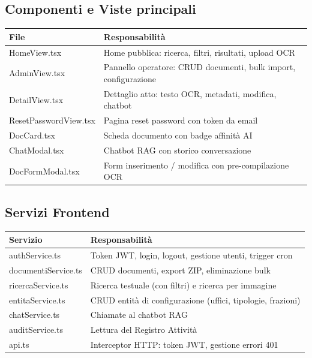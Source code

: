 \documentclass[12pt,a4paper,oneside]{report}
\begin{document}
\subsection{Componenti e Viste principali}
\begin{longtable}{>{\ttfamily}p{4.5cm} p{7.5cm}}
    \toprule
    \textbf{File} & \textbf{Responsabilit\`{a}} \\
    \midrule
    \endhead
    HomeView.tsx & Home pubblica: ricerca, filtri, risultati, upload OCR \\
    AdminView.tsx & Pannello operatore: CRUD documenti, bulk import, configurazione \\
    DetailView.tsx & Dettaglio atto: testo OCR, metadati, modifica, chatbot \\
    ResetPasswordView.tsx & Pagina reset password con token da email \\
    DocCard.tsx & Scheda documento con badge affinit\`{a} AI \\
    ChatModal.tsx & Chatbot RAG con storico conversazione \\
    DocFormModal.tsx & Form inserimento / modifica con pre-compilazione OCR \\
    \bottomrule
\end{longtable}

\subsection{Servizi Frontend}

\begin{longtable}{>{\ttfamily}p{4.5cm} p{7.5cm}}
    \toprule
    \textbf{Servizio} & \textbf{Responsabilit\`{a}} \\
    \midrule
    \endhead
    authService.ts & Token JWT, login, logout, gestione utenti, trigger cron \\
    documentiService.ts & CRUD documenti, export ZIP, eliminazione bulk \\
    ricercaService.ts & Ricerca testuale (con filtri) e ricerca per immagine \\
    entitaService.ts & CRUD entit\`{a} di configurazione (uffici, tipologie, frazioni) \\
    chatService.ts & Chiamate al chatbot RAG \\
    auditService.ts & Lettura del Registro Attivit\`{a} \\
    api.ts & Interceptor HTTP: token JWT, gestione errori 401 \\
    \bottomrule
\end{longtable}
\end{document}

